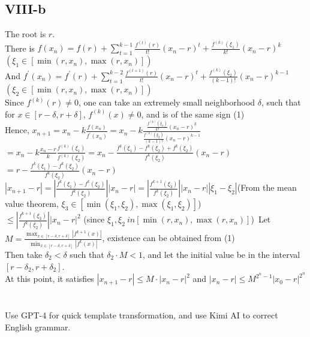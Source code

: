 \documentclass[a4paper]{article}
\begin{document}
\subsection*{VIII-b}
The root is \( r \).\\
There is \(f(x_n) = f(r) + \sum_{t=1}^{k-1} \frac{f^{(t)}(r)}{t!} (x_n - r)^t + \frac{f^{(k)}(\xi_1)}{k!} (x_n - r)^k\)\\
\( (\xi_1 \in [\min(r, x_n), \max(r, x_n)]) \)\\
And \(f^{'}(x_n) = f^{'}(r) + \sum_{t=1}^{k-2} \frac{f^{(t+1)}(r)}{t!} (x_n - r)^t + \frac{f^{(k)}(\xi_2)}{(k-1)!} (x_n - r)^{k-1}\)\
\( (\xi_2 \in [\min(r, x_n), \max(r, x_n)]) \)\\
Since \(f^{(k)}(r) \neq 0\), one can take an extremely small neighborhood \( \delta \), such that for \( x \in [r - \delta, r + \delta] \), \(f^{(k)}(x) \neq 0 \), and is of the same sign \hfill(1)\\
Hence, \( x_{n+1} = x_n - k \frac{f(x_n)}{f^{'}(x_n)} = x_n - k \frac{\frac{f^{(k)}(\xi_1)}{k!} (x_n - r)^k}{\frac{f^{(k)}(\xi_2)}{(k-1)!} (x_n - r)^{k-1}} \)\\
\( = x_n - k \frac{x_n - r}{k} \frac{f^{(k)}(\xi_1)}{f^{(k)}(\xi_2)} = x_n - \frac{f^{k}(\xi_1) - f^{k}(\xi_2) + f^{k}(\xi_2)}{f^{k}(\xi_2)} (x_n - r) \)\\
\( = r - \frac{f^{k}(\xi_1) - f^{k}(\xi_2)}{f^{k}(\xi_2)} (x_n - r) \)\\
\( |x_{n+1} - r| = \left|\frac{f^{k}(\xi_1) - f^{k}(\xi_2)}{f^{k}(\xi_2)}\right| |x_n - r| = \left|\frac{f^{k+1}(\xi_3)}{f^{k}(\xi_2)}\right| |x_n - r| |\xi_1 - \xi_2| \)(From the mean value theorem, \( \xi_3 \in [\min(\xi_1, \xi_2), \max(\xi_1, \xi_2)] \))\\
\( \leq \left|\frac{f^{k+1}(\xi_3)}{f^{k}(\xi_2)}\right| |x_n - r|^2 \) (since \( \xi_1, \xi_2 \ in [\min(r, x_n), \max(r, x_n)] \))\
Let \( M = \frac{\max_{x \in [r - \delta, r + \delta]} |f^{k+1}(x)|}{\min_{x \in [r - \delta, r + \delta]} |f^{k}(x)|} \), existence can be obtained from (1)\\
Then take \( \delta_2 < \delta \) such that \( \delta_2 \cdot M < 1 \), and let the initial value be in the interval \( [r - \delta_2, r + \delta_2] \).\\
At this point, it satisfies \( |x_{n+1} - r| \leq M \cdot |x_n - r|^2 \) and \( |x_n - r| \leq M^{2^n - 1} |x_0 - r|^{2^n} \)

\section*{ \center{\normalsize {Acknowledgement}} }
Use GPT-4 for quick template transformation, and use Kimi AI to correct English grammar.
\end{document}
